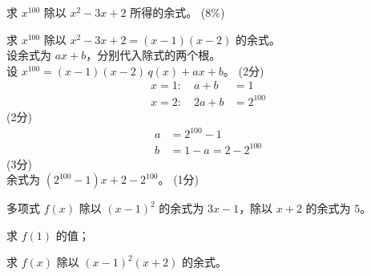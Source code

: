 \documentclass{exam-zh}
\newcommand{\qscoreoffset}{4em}
\newcommand{\qscore}[2][\%]{%
    \leavevmode\unskip\nobreak\hfill
    \makebox[0pt][l]{\makebox[\qscoreoffset][r]{(#2#1)}}%
}
\begin{document}
\begin{question}[points = 8]
    求 $x^{100}$ 除以 $x^2-3x+2$ 所得的余式。
    \hfill (8\%)
\end{question}

\begin{solution}
    求 $x^{100}$ 除以 $x^2-3x+2=(x-1)(x-2)$ 的余式。 \\
    设余式为 $ax+b$，分别代入除式的两个根。 \\
    设 $x^{100}=(x-1)(x-2)\,q(x)+ax+b$。
    \hfill (2分)
    \begin{align*}
        x=1:\quad a+b &= 1 \\
        x=2:\quad 2a+b &= 2^{100}
    \end{align*}
    \hfill (2分) \\
    \begin{align*}
        a &= 2^{100}-1 \\
        b &= 1-a = 2-2^{100}
    \end{align*}
    \hfill (3分) \\
    余式为 $(2^{100}-1)x+2-2^{100}$。
    \hfill (1分)
\end{solution}

\begin{question}[points = 10]
    多项式 $f(x)$ 除以 $(x-1)^2$ 的余式为 $3x-1$，除以 $x+2$ 的余式为 $5$。

    \begin{questionparts}
        \item 求 $f(1)$ 的值； \qscore{2}

        \item 求 $f(x)$ 除以 $(x-1)^2(x+2)$ 的余式。 \qscore{8}
    \end{questionparts}
\end{question}
\end{document}
